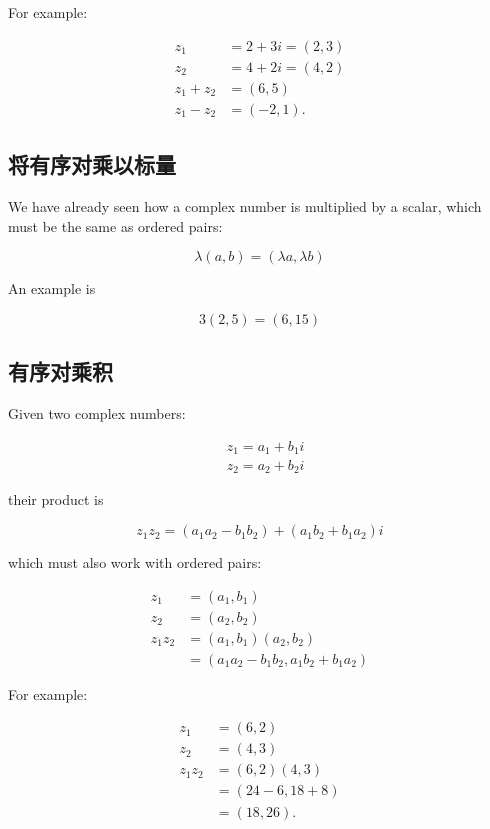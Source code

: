 For example:

$$
\begin{aligned}
z_{1} & =2+3 i=(2,3) \\
z_{2} & =4+2 i=(4,2) \\
z_{1}+z_{2} & =(6,5) \\
z_{1}-z_{2} & =(-2,1) .
\end{aligned}
$$

\subsection{将有序对乘以标量}
We have already seen how a complex number is multiplied by a scalar, which must be the same as ordered pairs:

$$
\lambda(a, b)=(\lambda a, \lambda b)
$$

An example is

$$
3(2,5)=(6,15)
$$

\subsection{有序对乘积}
Given two complex numbers:

$$
\begin{aligned}
& z_{1}=a_{1}+b_{1} i \\
& z_{2}=a_{2}+b_{2} i
\end{aligned}
$$

their product is

$$
z_{1} z_{2}=\left(a_{1} a_{2}-b_{1} b_{2}\right)+\left(a_{1} b_{2}+b_{1} a_{2}\right) i
$$

which must also work with ordered pairs:

$$
\begin{aligned}
z_{1} & =\left(a_{1}, b_{1}\right) \\
z_{2} & =\left(a_{2}, b_{2}\right) \\
z_{1} z_{2} & =\left(a_{1}, b_{1}\right)\left(a_{2}, b_{2}\right) \\
& =\left(a_{1} a_{2}-b_{1} b_{2}, a_{1} b_{2}+b_{1} a_{2}\right)
\end{aligned}
$$

For example:

$$
\begin{aligned}
z_{1} & =(6,2) \\
z_{2} & =(4,3) \\
z_{1} z_{2} & =(6,2)(4,3) \\
& =(24-6,18+8) \\
& =(18,26) .
\end{aligned}
$$

